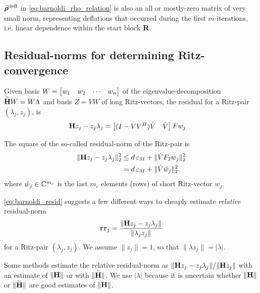 \smallskip
$\widetilde{\boldsymbol{\rho}}^{\text{defl}}$ in \eqref{eq:barnoldi_rho_relation} is also an all or mostly-zero matrix of very small norm, representing deflations that occurred during the first $m$-iterations, i.e. linear dependence within the start block $\textbf{\textup{R}}$.   






\subsection{Residual-norms for determining Ritz-convergence}
Given basis $W=\begin{bmatrix} w_1&w_2&\cdots&w_n\end{bmatrix}$ of the eigenvalue-decomposition $\widetilde{\textbf{\textup{H}}} W = W \Lambda$ and basis $Z= V W$ of long Ritz-vectors, the residual  for a Ritz-pair $(\lambda_j,z_j)$, is 
\begin{align*}
\textbf{\textup{H}} z_j - z_j \lambda_j &=\begin{bmatrix} (I-VV^H)\dot{V} & \hat{V}\end{bmatrix}F w_j
\end{align*}

The square of the so-called residual-norm of the Ritz-pair is 
\begin{equation}
\begin{aligned}
\| \textbf{\textup{H}} z_j - z_j \lambda_j \|_2^2  
&\leq d\,\varepsilon_M   + \|  \hat{V} F_2 w_j \|_2^2 \\
&= d\, \varepsilon_M   + \|  \hat{V} \tilde{w}_j \|_2^2.
\end{aligned}
\label{eq:barnoldi_resid}
\end{equation}
where $\tilde{w}_j\in\mathbb{C}^{m_c}$ is the last $m_c$ elements (rows) of short Ritz-vector $w_j$.

\eqref{eq:barnoldi_resid} suggests a few different ways to cheaply estimate  \emph{relative} residual-norm
\begin{equation}
 \texttt{rr}_j = \frac{\|\textbf{\textup{H}} z_j - z_j \lambda_j \|}{\|\lambda_j z_j \|} 
\label{eq:rel_resid_def}
\end{equation}
for a Ritz-pair $(\lambda_j,z_j)$.   We assume $\| z_j\|=1$, so that $\| \lambda z_j\| = | \lambda|$.

Some methods estimate the relative residual-norm as $\|\textbf{\textup{H}} z_j - z_j \lambda_j \| / \|\textbf{\textup{H}} z_j\|$ with an estimate of $\| \textbf{\textup{H}} \|$ or with $\| \widetilde{\textbf{\textup{H}}} \|$.    We use $| \lambda|$ because it is uncertain whether  $\| \textbf{\textup{H}} \|$ or $\| \widetilde{\textbf{\textup{H}}} \|$ are good estimates of $\| \textbf{\textup{H}} \|$.

